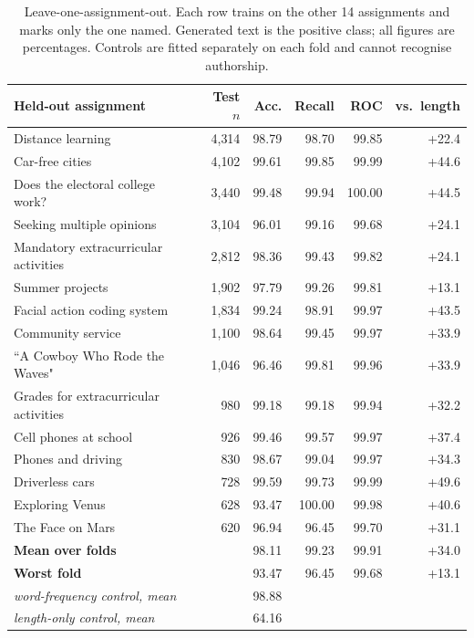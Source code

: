 \begin{table}[t]
\centering
\small
\caption{Leave-one-assignment-out. Each row trains on the other 14
assignments and marks only the one named. Generated text is the positive
class; all figures are percentages. Controls are fitted separately on
each fold and cannot recognise authorship.}
\label{tab:loto}
\begin{tabular}{@{}lrrrrr@{}}
\toprule
\textbf{Held-out assignment} & \textbf{Test $n$} & \textbf{Acc.} & \textbf{Recall} & \textbf{ROC} & \textbf{vs.\ length} \\
\midrule
Distance learning & 4{,}314 & 98.79 & 98.70 & 99.85 & +22.4 \\
Car-free cities & 4{,}102 & 99.61 & 99.85 & 99.99 & +44.6 \\
Does the electoral college work? & 3{,}440 & 99.48 & 99.94 & 100.00 & +44.5 \\
Seeking multiple opinions & 3{,}104 & 96.01 & 99.16 & 99.68 & +24.1 \\
Mandatory extracurricular activities & 2{,}812 & 98.36 & 99.43 & 99.82 & +24.1 \\
Summer projects & 1{,}902 & 97.79 & 99.26 & 99.81 & +13.1 \\
Facial action coding system & 1{,}834 & 99.24 & 98.91 & 99.97 & +43.5 \\
Community service & 1{,}100 & 98.64 & 99.45 & 99.97 & +33.9 \\
``A Cowboy Who Rode the Waves" & 1{,}046 & 96.46 & 99.81 & 99.96 & +33.9 \\
Grades for extracurricular activities & 980 & 99.18 & 99.18 & 99.94 & +32.2 \\
Cell phones at school & 926 & 99.46 & 99.57 & 99.97 & +37.4 \\
Phones and driving & 830 & 98.67 & 99.04 & 99.97 & +34.3 \\
Driverless cars & 728 & 99.59 & 99.73 & 99.99 & +49.6 \\
Exploring Venus & 628 & 93.47 & 100.00 & 99.98 & +40.6 \\
The Face on Mars & 620 & 96.94 & 96.45 & 99.70 & +31.1 \\
\midrule
\textbf{Mean over folds} & & 98.11 & 99.23 & 99.91 & +34.0 \\
\textbf{Worst fold} & & 93.47 & 96.45 & 99.68 & +13.1 \\
\midrule
\emph{word-frequency control, mean} & & 98.88 & & & \\
\emph{length-only control, mean} & & 64.16 & & & \\
\bottomrule
\end{tabular}
\end{table}

